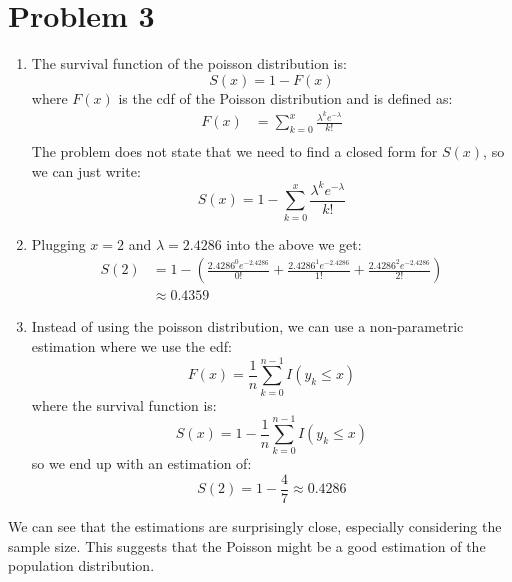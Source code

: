 \documentclass{article}
\begin{document}
\section*{Problem 3}
\begin{enumerate}
\item The survival function of the poisson distribution is: \\
\[
S(x) = 1 - F(x)
\]
where $F(x)$ is the cdf of the Poisson distribution and is defined as: \\
\begin{align*}
F(x) &= \sum_{k=0}^{x}\frac{\lambda^ke^{-\lambda}}{k!}\\
\end{align*}
The problem does not state that we need to find a closed form for $S(x)$, so we can just write: \\
\[
S(x) = 1 - \sum_{k=0}^{x}\frac{\lambda^ke^{-\lambda}}{k!}
\]
\item Plugging $x = 2$ and $\lambda = 2.4286$ into the above we get: \\
\begin{align*}
S(2) &= 1 - (\frac{2.4286^0e^{-2.4286}}{0!} + \frac{2.4286^1e^{-2.4286}}{1!} + \frac{2.4286^2e^{-2.4286}}{2!}) \\
&\approx 0.4359
\end{align*}
\item Instead of using the poisson distribution, we can use a non-parametric estimation where we use the edf:\\
\[
F(x) = \frac{1}{n}\sum_{k=0}^{n-1}I(y_k \leq x)
\]
where the survival function is: \\
\[
S(x) = 1 - \frac{1}{n}\sum_{k=0}^{n-1}I(y_k \leq x)
\]
so we end up with an estimation of: \\
\[
S(2) = 1 - \frac{4}{7} \approx 0.4286
\]
\end{enumerate}
We can see that the estimations are surprisingly close, especially considering the sample size. This suggests that the Poisson might be a good estimation of the population distribution. 
\end{document}
